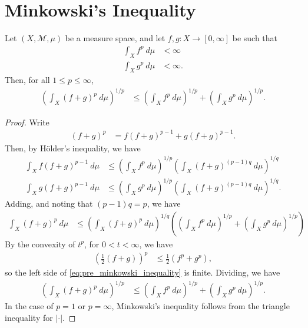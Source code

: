 \documentclass[10pt]{mypackage}
\begin{document}
\section{Minkowski's Inequality}%
\begin{theorem}
  Let $\left( X,\mathcal{M},\mu \right)$ be a measure space, and let $f,g\colon X\rightarrow [0,\infty]$ be such that
  \begin{align*}
    \int_{X}^{} f^{p}\:d\mu &< \infty\\
    \int_{X}^{} g^{p}\:d\mu &< \infty.
  \end{align*}
  Then, for all $1 \leq p \leq \infty$,
  \begin{align*}
    \left( \int_{X}^{} \left( f + g \right)^{p}\:d\mu \right)^{1/p} &\leq \left( \int_{X}^{} f^{p}\:d\mu \right)^{1/p} + \left( \int_{X}^{} g^{p}\:d\mu \right)^{1/p}.
  \end{align*}
\end{theorem}
\begin{proof}
  Write 
  \begin{align*}
    \left( f + g \right)^{p} &= f\left( f + g \right)^{p-1} + g\left( f + g \right)^{p-1}.
  \end{align*}
  Then, by Hölder's inequality, we have
  \begin{align*}
    \int_{X}^{} f \left( f + g \right)^{p-1}\:d\mu &\leq \left( \int_{X}^{} f^{p}\:d\mu \right)^{1/p}\left( \int_{X}^{} \left( f + g \right)^{\left( p-1 \right)q}\:d\mu \right) ^{1/q}\\
    \int_{X}^{} g\left( f + g \right)^{p-1}\:d\mu &\leq \left( \int_{X}^{} g^{p}\:d\mu \right)^{1/p}\left( \int_{X}^{} \left( f + g \right)^{\left( p-1 \right)q}\:d\mu \right)^{1/q}.
  \end{align*}
  Adding, and noting that $\left( p-1 \right)q = p$, we have
  \begin{align*}
    \int_{X}^{} \left( f + g \right)^{p}\:d\mu &\leq \left( \int_{X}^{} \left( f + g \right)^{p}\:d\mu \right)^{1/q}\left( \left( \int_{X}^{} f^{p}\:d\mu \right)^{1/p} + \left( \int_{X}^{} g^{p}\:d\mu \right)^{1/p} \right)\label{eq:pre_minkowski_inequality}\tag{\textasteriskcentered}
  \end{align*}
  By the convexity of $t^{p}$, for $0 < t < \infty$, we have
  \begin{align*}
    \left( \frac{1}{2}\left( f + g \right) \right)^{p} &\leq \frac{1}{2}\left( f^{p} + g^{p} \right),
  \end{align*}
  so the left side of \eqref{eq:pre_minkowski_inequality} is finite. Dividing, we have
  \begin{align*}
    \left( \int_{X}^{} \left( f + g \right)^{p}\:d\mu \right)^{1/p} &\leq \left( \int_{X}^{} f^{p}\:d\mu \right)^{1/p} + \left( \int_{X}^{} g^{p}\:d\mu \right)^{1/p}.
  \end{align*}
  In the case of $p = 1$ or $p = \infty$, Minkowski's inequality follows from the triangle inequality for $\left\vert \cdot \right\vert$.
\end{proof}
\end{document}
